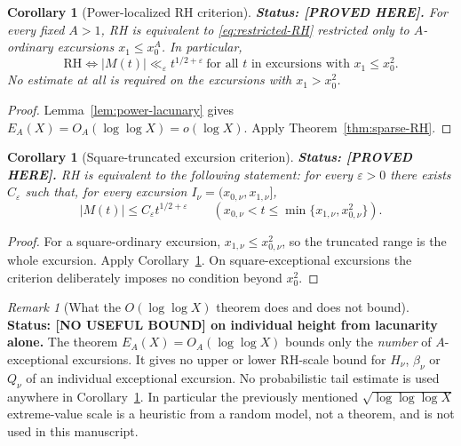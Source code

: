 \documentclass[11pt]{amsart}
\numberwithin{equation}{section}
\theoremstyle{plain}
\newtheorem{corollary}[theorem]{Corollary}
\theoremstyle{definition}
\theoremstyle{remark}
\newtheorem{remark}[theorem]{Remark}
\begin{document}
\begin{corollary}[Power-localized RH criterion]
\label{cor:power-ordinary-RH}
\textbf{Status: [PROVED HERE].} For every fixed $A>1$, RH is equivalent to \eqref{eq:restricted-RH}
restricted only to $A$-ordinary excursions $x_1\le x_0^A$. In particular,
\begin{equation}
\boxed{\mathrm{RH}\iff
|M(t)|\ll_\varepsilon t^{1/2+\varepsilon}
\ \text{for all $t$ in excursions with }x_1\le x_0^2.}
\label{eq:square-horizon-RH}
\end{equation}
No estimate at all is required on the excursions with $x_1>x_0^2$.
\end{corollary}

\begin{proof}
Lemma~\ref{lem:power-lacunary} gives $E_A(X)=O_A(\log\log X)=o(\log X)$.
Apply Theorem~\ref{thm:sparse-RH}.
\end{proof}

\begin{corollary}[Square-truncated excursion criterion]
\label{cor:square-truncated-RH}
\textbf{Status: [PROVED HERE].} RH is equivalent to the following statement:
for every $\varepsilon>0$ there exists $C_\varepsilon$ such that, for every
excursion $I_\nu=(x_{0,\nu},x_{1,\nu}]$,
\[
|M(t)|\le C_\varepsilon t^{1/2+\varepsilon}
\qquad
\left(x_{0,\nu}<t\le\min\{x_{1,\nu},x_{0,\nu}^2\}\right).
\]
\end{corollary}

\begin{proof}
For a square-ordinary excursion, $x_{1,\nu}\le x_{0,\nu}^2$, so the
truncated range is the whole excursion.  Apply
Corollary~\ref{cor:power-ordinary-RH}.  On square-exceptional excursions the
criterion deliberately imposes no condition beyond $x_0^2$.
\end{proof}

\begin{remark}[What the $O(\log\log X)$ theorem does and does not bound]
\label{rem:no-height-from-lacunarity}
\textbf{Status: [NO USEFUL BOUND] on individual height from lacunarity alone.}
The theorem $E_A(X)=O_A(\log\log X)$ bounds only the \emph{number} of
$A$-exceptional excursions. It gives no upper or lower RH-scale bound for
$H_\nu$, $\beta_\nu$ or $Q_\nu$ of an individual exceptional excursion.
No probabilistic tail estimate is used anywhere in
Corollary~\ref{cor:power-ordinary-RH}. In particular the previously
mentioned $\sqrt{\log\log\log X}$ extreme-value scale is a heuristic
from a random model, not a theorem, and is not used in this manuscript.
\end{remark}
\end{document}
